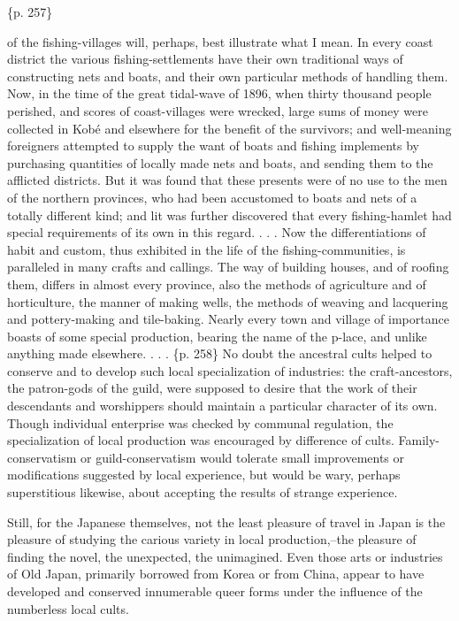 \{p. 257\}

of the fishing-villages will, perhaps, best illustrate what I mean. In every coast district the various fishing-settlements have their own traditional ways of constructing nets and boats, and their own particular methods of handling them. Now, in the time of the great tidal-wave of 1896, when thirty thousand people perished, and scores of coast-villages were wrecked, large sums of money were collected in Kobé and elsewhere for the benefit of the survivors; and well-meaning foreigners attempted to supply the want of boats and fishing implements by purchasing quantities of locally made nets and boats, and sending them to the afflicted districts. But it was found that these presents were of no use to the men of the northern provinces, who had been accustomed to boats and nets of a totally different kind; and lit was further discovered that every fishing-hamlet had special requirements of its own in this regard. . . . Now the differentiations of habit and custom, thus exhibited in the life of the fishing-communities, is paralleled in many crafts and callings. The way of building houses, and of roofing them, differs in almost every province, also the methods of agriculture and of horticulture, the manner of making wells, the methods of weaving and lacquering and pottery-making and tile-baking. Nearly every town and village of importance boasts of some special production, bearing the name of the p-lace, and unlike anything made elsewhere. . . . \{p. 258\} No doubt the ancestral cults helped to conserve and to develop such local specialization of industries: the craft-ancestors, the patron-gods of the guild, were supposed to desire that the work of their descendants and worshippers should maintain a particular character of its own. Though individual enterprise was checked by communal regulation, the specialization of local production was encouraged by difference of cults. Family-conservatism or guild-conservatism would tolerate small improvements or modifications suggested by local experience, but would be wary, perhaps superstitious likewise, about accepting the results of strange experience.

Still, for the Japanese themselves, not the least pleasure of travel in Japan is the pleasure of studying the carious variety in local production,--the pleasure of finding the novel, the unexpected, the unimagined. Even those arts or industries of Old Japan, primarily borrowed from Korea or from China, appear to have developed and conserved innumerable queer forms under the influence of the numberless local cults.

